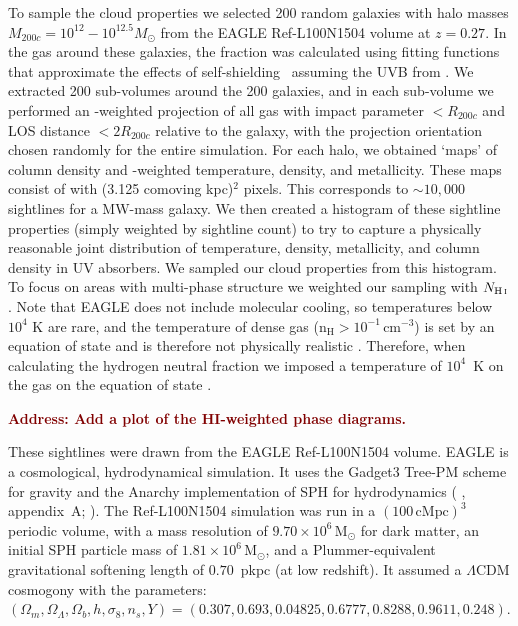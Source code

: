 \documentclass[fleqn,usenatbib]{mnras}
\newcommand{\todo}[1]{\textcolor{Maroon}{\textbf{Address: #1}}}
\begin{document}
To sample the cloud properties we selected 200 random galaxies with halo masses $M_{200c} = 10^{12} - 10^{12.5} M_\odot$ from the EAGLE Ref-L100N1504 volume at $z=0.27$.
In the gas around these galaxies, the  fraction was calculated using fitting functions that approximate the effects of self-shielding~\citep{Rahmati2013} assuming the UVB from \cite{Haardt2001}.
We extracted 200 sub-volumes around the 200 galaxies, and in each sub-volume we performed an -weighted projection of all gas with impact parameter $< R_{200c}$ and LOS distance $< 2 R_{200c}$ relative to the galaxy, with the projection orientation chosen randomly for the entire simulation.
For each halo, we obtained  `maps' of  column density and -weighted temperature, density, and metallicity. These maps consist of with (3.125 comoving kpc)$^2$ pixels.
This corresponds to $\sim 10,000$ sightlines for a MW-mass galaxy.
We then created a histogram of these sightline properties (simply weighted by sightline count) to try to capture a physically reasonable joint distribution of temperature, density, metallicity, and  column density in UV absorbers. We sampled our cloud properties from this histogram.
To focus on areas with multi-phase structure we weighted our sampling with $N_{\ion{H}{I}}$.
Note that EAGLE does not include molecular cooling, so temperatures below $10^4$ K are rare, and the temperature of dense gas ($\mathrm{n}_{\mathrm{H}} > 10^{-1} \, \mathrm{cm}^{-3}$) is set by an equation of state and is therefore not physically realistic \citep{Schaye2015}. Therefore, when calculating the hydrogen neutral fraction we imposed a temperature of $10^4$~K on the gas on the equation of state \citep[following e.g.,][]{Rahmati2015}.

\todo{Add a plot of the HI-weighted phase diagrams.}

These sightlines were drawn from the EAGLE Ref-L100N1504 volume. EAGLE \citep[`Evolution and Assembly of GaLaxies and their Environments';][]{Schaye2015,Crain2015,McAlpine2016} is a cosmological, hydrodynamical simulation. It uses the Gadget3 Tree-PM scheme for gravity \citep[][]{Springel2005} and the Anarchy implementation of SPH for hydrodynamics (\citeauthor{Schaye2015} \citeyear{Schaye2015}, appendix~A; \citeauthor{Schaller2015} \citeyear{Schaller2015}). The Ref-L100N1504 simulation was run in a $(100\,\mathrm{cMpc})^3$ periodic volume, with a mass resolution of $9.70 \times 10^6 \,\mathrm{M}_{\odot}$ for dark matter, an initial SPH particle mass of $1.81 \times 10^6 \,\mathrm{M}_{\odot}$, and a Plummer-equivalent gravitational softening length of $0.70$~pkpc (at low redshift). It assumed a $\Lambda$CDM cosmogony with the \citet{PlanckCollaboration2013} parameters: $(\Omega_m,\Omega_\Lambda,\Omega_b, h, \sigma_8, n_s, Y) = (0.307, 0.693, 0.04825, 0.6777, 0.8288, 0.9611, 0.248)$.
\end{document}
